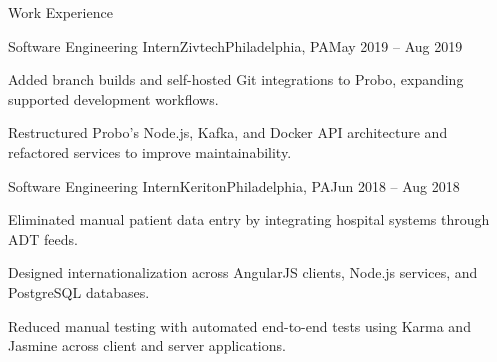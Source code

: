 \documentclass{resume} %
\begin{document}
\begin{rSection}{Work Experience}

\begin{rSubsection}{Software Engineering Intern}{Zivtech}{Philadelphia, PA}{May 2019 -- Aug 2019}
\item Added branch builds and self-hosted Git integrations to Probo, expanding supported development workflows.
\item Restructured Probo's Node.js, Kafka, and Docker API architecture and refactored services to improve maintainability.
\end{rSubsection}


\begin{rSubsection}{Software Engineering Intern}{Keriton}{Philadelphia, PA}{Jun 2018 -- Aug 2018}
\item Eliminated manual patient data entry by integrating hospital systems through ADT feeds.
\item Designed internationalization across AngularJS clients, Node.js services, and PostgreSQL databases.
\item Reduced manual testing with automated end-to-end tests using Karma and Jasmine across client and server applications.
\end{rSubsection}

\end{rSection}

\end{document}
